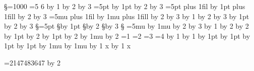 
\countdef{} \dimendef{} \skipdef\S=1000 \muskipdef{} \toksdef{}
\def\c{\showthe\count300}\def\d{\showthe\dimen300}\def\s{\showthe\skip300}\def\m{\showthe\muskip300}
=5 \c
{} 6 \c
\advance{} by 1 \c
\multiply{} by 2 \c
\divide{} by 3 \c
{}=5pt \d
\advance{} by 1pt \d
\multiply{} by 2 \d
\divide{} by 3 \d
{}=5pt plus 1fil \s
\advance{} by 1pt plus 1fill \s
\multiply{} by 2 \s
\divide{} by 3 \s
{}=5mu plus 1fil \m
\advance{} by 1mu plus 1fill \m
\multiply{} by 2 \m
\divide{} by 3 \m
 \showthe\C
{} \showthe\C
\advance\C by 1 \showthe\C
\multiply\C by 2 \showthe\C
\divide\C by 3 \showthe\C
\D=5pt \advance\D by 1pt \multiply\D by 2 \divide\D by 3 \showthe\D
\S=5pt \advance\S by 1pt \multiply\S by 2 \divide\S by 3 \showthe\S
\M=5mu \advance\M by 1mu \multiply\M by 2 \divide\M by 3 \showthe\M
\advance{} by 1 \showthe{}
\multiply{} by 2 \showthe{}
\divide{} by 2 \showthe{}
\advance{} by 1pt \showthe{}
\multiply{} by 2 \showthe{}
\advance{} by 1pt \showthe{}
\multiply{} by 2 \showthe{}
\advance{} by 1mu \showthe{}
\multiply{} by 2 \showthe{}
=1 =2 =3 =4 \showthe{} \showthe{} \showthe{}
\advance{} by 1 \showthe{}
\advance{} by 1
\advance{} by 1pt \showthe{}
\advance{} by 1pt
\advance{} by 1pt \showthe{}
\advance{} by 1pt
\advance{} by 1mu \showthe{}
\advance{} by 1mu
\advance{} by 1
\advance\count x by 1 x\par
=2147483647 \multiply{} by 2 \c
